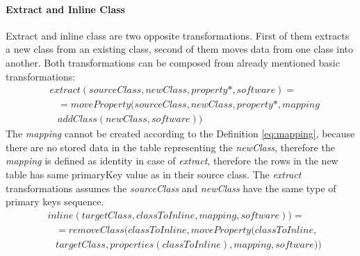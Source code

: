 \documentclass[runningheads]{comsis}
\begin{document}
\paragraph{Extract and Inline Class}
Extract and inline class are two opposite transformations. First of them extracts a new class from an existing class, second of them moves data from one class into another. Both transformations can be composed from already mentioned basic transformations:
\begin{align}
& extract(sourceClass, newClass, property*, software) = \nonumber  \\ 
& \; \; \; = moveProperty(sourceClass, newClass, property*, mapping \nonumber \\ 
& \; \; \; addClass(newClass, software))
\end{align}
The \emph{mapping} cannot be created according to the Definition \ref{eq:mapping}, because there are no stored data in the table representing the \emph{newClass}, therefore the \emph{mapping} is defined as identity in case of \emph{extract}, therefore the rows in the new table has same primaryKey value as in their source class. The \emph{extract} transformations assumes the \emph{sourceClass} and \emph{newClass} have the same type of primary keys sequence. 
\begin{align}
& inline(targetClass, classToInline, mapping, software)) =  \nonumber \\
& \; \; \; = removeClass(classToInline, moveProperty(classToInline, \nonumber \\
& \; \; \; targetClass, properties(classToInline), mapping, software))
\end{align}
\end{document}
